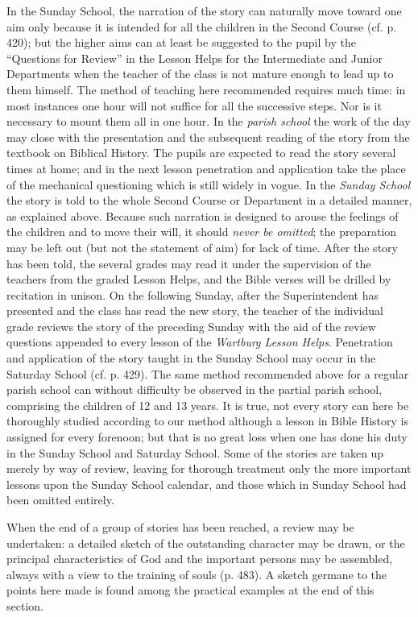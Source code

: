 In the Sunday School, the narration of the story can naturally move toward one aim only because it is intended for all the children in the Second Course (cf. p. 420); but the higher aims can at least be suggested to the pupil by the “Questions for Review” in the Lesson Helps for the Intermediate and Junior Departments when the teacher of the class is not mature enough to lead up to them himself.
The method of teaching here recommended requires much time: in most instances one hour will not suffice for all the successive steps. Nor is it necessary to mount them all in one hour. In the \emph{parish school} the work of the day may close with the presentation and the subsequent reading of the story from the textbook on Biblical History. The pupils are expected to read the story several times at home; and in the next lesson penetration and application take the place of the mechanical questioning which is still widely in vogue. In the \emph{Sunday School} the story is told to the whole Second Course or Department in a detailed manner, as explained above. Because such narration is designed to arouse the feelings of the children and to move their will, it should \emph{never be omitted}; the preparation may be left out (but not the statement of aim) for lack of time. After the story has been told, the several grades may read it under the supervision of the teachers from the graded Lesson Helps, and the Bible verses will be drilled by recitation in unison. On the following Sunday, after the Superintendent has presented and the class has read the new story, the teacher of the individual grade reviews the story of the preceding Sunday with the aid of the review questions appended to every lesson of the \emph{Wartburg Lesson Helps}. Penetration and application of the story taught in the Sunday School may occur in the Saturday School (cf. p. 429). The same method recommended above for a regular parish school can without difficulty be observed in the partial parish school, comprising the children of 12 and 13 years. It is true, not every story can here be thoroughly studied according to our method although a lesson in Bible History is assigned for every forenoon; but that is no great loss when one has done his duty in the Sunday School and Saturday School. Some of the stories are taken up merely by way of review, leaving for thorough treatment only the more important lessons upon
the Sunday School calendar, and those which in Sunday School had been omitted entirely.

When the end of a group of stories has been reached, a review may be undertaken: a detailed sketch of the outstanding character may be drawn, or the principal characteristics of God and the important persons may be assembled, always with a view to the training of souls (p. 483). A sketch germane to the points here made is found among the practical examples at the end of this section.

